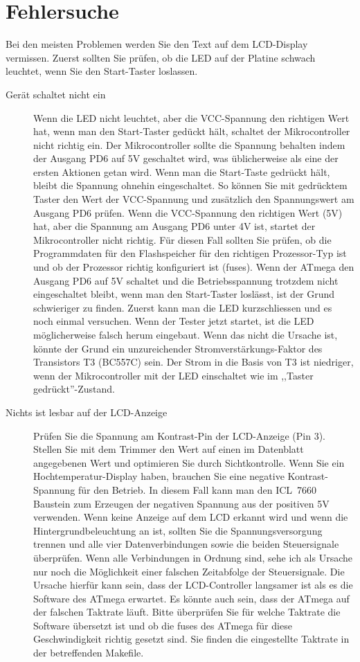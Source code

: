 \section{Fehlersuche}
Bei den meisten Problemen werden Sie den Text auf dem LCD-Display vermissen.
Zuerst sollten Sie pr\"ufen, ob die LED auf der Platine schwach leuchtet, wenn Sie den Start-Taster
loslassen.
\begin{description}

\item[Ger\"at schaltet nicht ein]  
Wenn die LED nicht leuchtet, aber die VCC-Spannung den richtigen Wert hat, wenn
man den Start-Taster ged\"uckt h\"alt, schaltet der Mikrocontroller nicht richtig ein.
Der Mikrocontroller sollte die Spannung behalten indem der Ausgang PD6 auf 5V
geschaltet wird, was \"ublicherweise als eine der ersten Aktionen getan wird.
Wenn man die Start-Taste gedr\"uckt h\"alt, bleibt die Spannung ohnehin eingeschaltet.
So k\"onnen Sie mit gedr\"ucktem Taster den Wert der VCC-Spannung und zus\"atzlich den Spannungswert am
Ausgang PD6 pr\"ufen.
Wenn die VCC-Spannung den richtigen Wert (5V) hat, aber die Spannung am Ausgang
PD6 unter 4V ist, startet der Mikrocontroller nicht richtig.
F\"ur diesen Fall sollten Sie pr\"ufen, ob die Programmdaten f\"ur den Flashspeicher
f\"ur den richtigen Prozessor-Typ ist und ob der Prozessor richtig konfiguriert ist (fuses).
Wenn der ATmega den Ausgang PD6 auf 5V schaltet und die Betriebsspannung 
trotzdem nicht eingeschaltet bleibt, wenn man den Start-Taster losl\"asst, ist der
Grund schwieriger zu finden.
Zuerst kann man die LED kurzschliessen und es noch einmal versuchen.
Wenn der Tester jetzt startet, ist die LED m\"oglicherweise falsch herum eingebaut.
Wenn das nicht die Ursache ist, k\"onnte der Grund ein unzureichender Stromverst\"arkungs-Faktor
des Transistors T3 (BC557C) sein.
Der Strom in die Basis von T3 ist niedriger, wenn der Mikrocontroller mit der LED einschaltet
wie im ,,Taster gedr\"uckt''-Zustand.

\item[Nichts ist lesbar auf der LCD-Anzeige] 
Pr\"ufen Sie die Spannung am Kontrast-Pin der LCD-Anzeige (Pin 3).
Stellen Sie mit dem Trimmer den Wert auf einen im Datenblatt angegebenen Wert und optimieren Sie
durch Sichtkontrolle.
Wenn Sie ein Hochtemperatur-Display haben, brauchen Sie eine negative Kontrast-Spannung f\"ur
den Betrieb.
In diesem Fall kann man den ICL~7660 Baustein zum Erzeugen der negativen Spannung aus der
positiven 5V verwenden.
Wenn keine Anzeige auf dem LCD erkannt wird und wenn die Hintergrundbeleuchtung an ist,
sollten Sie die Spannungsversorgung trennen und alle vier Datenverbindungen sowie die 
beiden Steuersignale \"uberpr\"ufen.
Wenn alle Verbindungen in Ordnung sind, sehe ich als Ursache nur noch die M\"oglichkeit einer
falschen Zeitabfolge der Steuersignale.
Die Ursache hierf\"ur kann sein, dass der LCD-Controller langsamer ist als es die Software
des ATmega erwartet. Es k\"onnte auch sein, dass der ATmega auf der falschen Taktrate l\"auft.
Bitte \"uberpr\"ufen Sie f\"ur welche Taktrate die Software \"ubersetzt ist und ob
die fuses des ATmega f\"ur diese Geschwindigkeit richtig gesetzt sind.
Sie finden die eingestellte Taktrate in der betreffenden Makefile.


\end{description}

